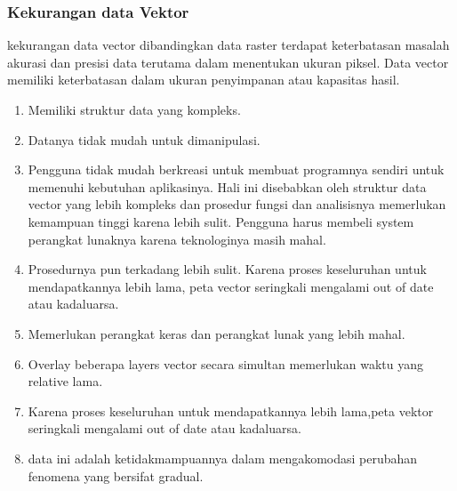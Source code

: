 \subsubsection{Kekurangan data Vektor}
kekurangan data vector dibandingkan data raster
terdapat keterbatasan masalah akurasi dan presisi data terutama dalam menentukan ukuran piksel. Data vector memiliki keterbatasan dalam ukuran penyimpanan atau kapasitas hasil.
\begin{enumerate}
\item Memiliki struktur data yang kompleks.
\item Datanya tidak mudah untuk dimanipulasi.
\item Pengguna tidak mudah berkreasi untuk membuat programnya sendiri untuk memenuhi kebutuhan aplikasinya. Hali ini disebabkan oleh struktur data vector yang lebih kompleks dan prosedur fungsi dan analisisnya memerlukan kemampuan tinggi karena lebih sulit. Pengguna harus membeli system perangkat lunaknya karena teknologinya masih mahal.
\item Prosedurnya pun terkadang lebih sulit. Karena proses keseluruhan untuk mendapatkannya lebih lama, peta vector seringkali mengalami out of date atau kadaluarsa.
\item Memerlukan perangkat keras dan perangkat lunak yang lebih mahal.
\item Overlay beberapa layers vector secara simultan memerlukan waktu yang relative lama.
\item Karena proses keseluruhan untuk mendapatkannya lebih lama,peta vektor seringkali mengalami out of date atau kadaluarsa.
\item data ini adalah ketidakmampuannya dalam mengakomodasi perubahan fenomena yang bersifat gradual.
\end{enumerate}


